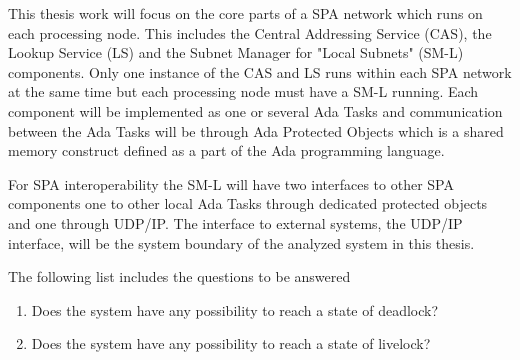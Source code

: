


This thesis work will focus on the core parts of a SPA network which runs on
each processing node. This includes the Central Addressing Service
(CAS), the Lookup Service (LS) and the Subnet Manager for "Local Subnets"
(SM-L) components. Only one instance of the CAS and LS runs within each SPA
network at the same time but each processing node must have a SM-L running.
Each component will be implemented as one or several Ada Tasks and
communication between the Ada Tasks will be through Ada Protected Objects which
is a shared memory construct defined as a part of the Ada programming language.

For SPA interoperability the SM-L will have two interfaces to other SPA
components one to other local Ada Tasks through dedicated protected objects and
one through UDP/IP. The interface to external systems, the UDP/IP interface,
will be the system boundary of the analyzed system in this thesis.


The following list includes the questions to be answered
\begin{enumerate}
    \item Does the system have any possibility to reach a state of deadlock?
    \item Does the system have any possibility to reach a state of livelock?
\end{enumerate}

